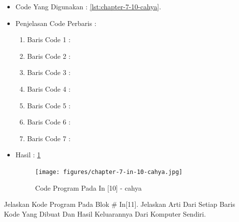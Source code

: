 \begin{itemize}
\item Code Yang Digunakan : \ref{lst:chapter-7-10-cahya}.

\par
\par
\item Penjelasan Code Perbaris	: 
\begin{enumerate}
\item Baris Code 1	:
\item Baris Code 2	:
\item Baris Code 3	:
\item Baris Code 4	:
\item Baris Code 5	:
\item Baris Code 6	:
\item Baris Code 7	:
\end{enumerate}
\par
\item Hasil : \ref{chapter-7-in-10-cahya}
\par
\par
\begin{figure}[!hbtp]
\centering
\texttt{[image: figures/chapter-7-in-10-cahya.jpg]}
\caption{Code Program Pada In [10] - cahya}
\label{chapter-7-in-10-cahya}
\end{figure}
\par
\par
\end{itemize}
\par
\par
\par
\item Jelaskan Kode Program Pada Blok \# In[11]. Jelaskan Arti Dari Setiap Baris Kode Yang Dibuat Dan Hasil Keluarannya Dari Komputer Sendiri.

